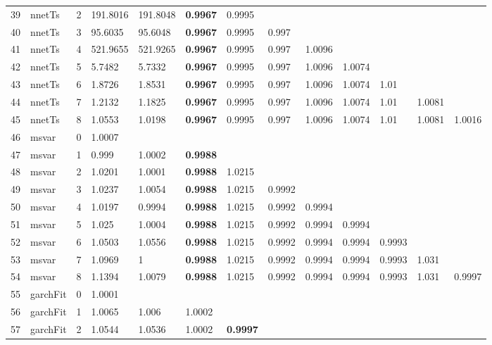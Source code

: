 \documentclass[10pt,a4paper]{article}
\begin{document}
\begin{table}[ht]
\begin{tabular}{rlrllllllllll}
  39 & nnetTs &     2 & 191.8016 & 191.8048 & \textbf{0.9967} & 0.9995 &  &  &  &  &  &  \\ 
  40 & nnetTs &     3 & 95.6035 & 95.6048 & \textbf{0.9967} & 0.9995 & 0.997 &  &  &  &  &  \\ 
  41 & nnetTs &     4 & 521.9655 & 521.9265 & \textbf{0.9967} & 0.9995 & 0.997 & 1.0096 &  &  &  &  \\ 
  42 & nnetTs &     5 & 5.7482 & 5.7332 & \textbf{0.9967} & 0.9995 & 0.997 & 1.0096 & 1.0074 &  &  &  \\ 
  43 & nnetTs &     6 & 1.8726 & 1.8531 & \textbf{0.9967} & 0.9995 & 0.997 & 1.0096 & 1.0074 & 1.01 &  &  \\ 
  44 & nnetTs &     7 & 1.2132 & 1.1825 & \textbf{0.9967} & 0.9995 & 0.997 & 1.0096 & 1.0074 & 1.01 & 1.0081 &  \\ 
  45 & nnetTs &     8 & 1.0553 & 1.0198 & \textbf{0.9967} & 0.9995 & 0.997 & 1.0096 & 1.0074 & 1.01 & 1.0081 & 1.0016 \\ 
   \hline
46 & msvar &     0 & 1.0007 &  &  &  &  &  &  &  &  &  \\ 
  47 & msvar &     1 & 0.999 & 1.0002 & \textbf{0.9988} &  &  &  &  &  &  &  \\ 
  48 & msvar &     2 & 1.0201 & 1.0001 & \textbf{0.9988} & 1.0215 &  &  &  &  &  &  \\ 
  49 & msvar &     3 & 1.0237 & 1.0054 & \textbf{0.9988} & 1.0215 & 0.9992 &  &  &  &  &  \\ 
  50 & msvar &     4 & 1.0197 & 0.9994 & \textbf{0.9988} & 1.0215 & 0.9992 & 0.9994 &  &  &  &  \\ 
  51 & msvar &     5 & 1.025 & 1.0004 & \textbf{0.9988} & 1.0215 & 0.9992 & 0.9994 & 0.9994 &  &  &  \\ 
  52 & msvar &     6 & 1.0503 & 1.0556 & \textbf{0.9988} & 1.0215 & 0.9992 & 0.9994 & 0.9994 & 0.9993 &  &  \\ 
  53 & msvar &     7 & 1.0969 & 1 & \textbf{0.9988} & 1.0215 & 0.9992 & 0.9994 & 0.9994 & 0.9993 & 1.031 &  \\ 
  54 & msvar &     8 & 1.1394 & 1.0079 & \textbf{0.9988} & 1.0215 & 0.9992 & 0.9994 & 0.9994 & 0.9993 & 1.031 & 0.9997 \\ 
   \hline
55 & garchFit &     0 & 1.0001 &  &  &  &  &  &  &  &  &  \\ 
  56 & garchFit &     1 & 1.0065 & 1.006 & 1.0002 &  &  &  &  &  &  &  \\ 
  57 & garchFit &     2 & 1.0544 & 1.0536 & 1.0002 & \textbf{0.9997} &  &  &  &  &  &  \\ 

\end{tabular}
\end{table}
\end{document}
